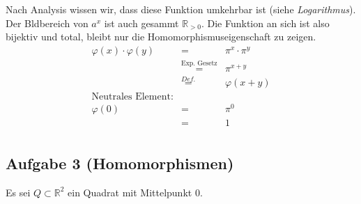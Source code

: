 \documentclass[11pt,a4paper,ngerman]{article}
\newcommand{\R}{\mathbb{R}}
\begin{document}
Nach Analysis wissen wir, dass diese Funktion umkehrbar ist (siehe \emph{Logarithmus}). Der Bldbereich von $a^x$ ist auch gesammt $\R_{>0}$. Die Funktion an sich ist also bijektiv und total, bleibt nur die Homomorphismuseigenschaft zu zeigen.
$$
\begin{array}{rcl}
\varphi (x) \cdot \varphi (y) &=& \pi^{x} \cdot \pi^{y}\\
	&\stackrel{\text{Exp. Gesetz}}{=}& \pi^{x + y}\\
	&\stackrel{Def.}{=}& \varphi(x+y)\\
\text{Neutrales Element:}&&\\
\varphi (0) &=& \pi^0\\
	&=& 1\\
\end{array}
$$

\subsection*{Aufgabe 3 \mdseries (Homomorphismen)}
Es sei $Q \subset \R^2$ ein Quadrat mit Mittelpunkt 0.\\
\end{document}

